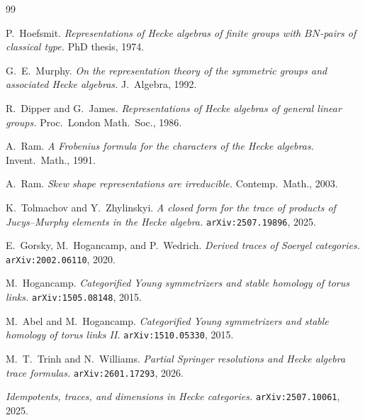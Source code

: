 \documentclass[11pt]{article}
\theoremstyle{definition}
\begin{document}
\begin{thebibliography}{99}

P.~Hoefsmit.
\emph{Representations of Hecke algebras of finite groups with $BN$-pairs of classical type.}
PhD thesis, 1974.

G.~E.~Murphy.
\emph{On the representation theory of the symmetric groups and associated Hecke algebras.}
J.\ Algebra, 1992.

R.~Dipper and G.~James.
\emph{Representations of Hecke algebras of general linear groups.}
Proc.\ London Math.\ Soc., 1986.

A.~Ram.
\emph{A Frobenius formula for the characters of the Hecke algebras.}
Invent.\ Math., 1991.

A.~Ram.
\emph{Skew shape representations are irreducible.}
Contemp.\ Math., 2003.

K.~Tolmachov and Y.~Zhylinskyi.
\emph{A closed form for the trace of products of Jucys--Murphy elements in the Hecke algebra.}
\texttt{arXiv:2507.19896}, 2025.

E.~Gorsky, M.~Hogancamp, and P.~Wedrich.
\emph{Derived traces of Soergel categories.}
\texttt{arXiv:2002.06110}, 2020.

M.~Hogancamp.
\emph{Categorified Young symmetrizers and stable homology of torus links.}
\texttt{arXiv:1505.08148}, 2015.

M.~Abel and M.~Hogancamp.
\emph{Categorified Young symmetrizers and stable homology of torus links II.}
\texttt{arXiv:1510.05330}, 2015.

M.~T.~Trinh and N.~Williams.
\emph{Partial Springer resolutions and Hecke algebra trace formulas.}
\texttt{arXiv:2601.17293}, 2026.

\emph{Idempotents, traces, and dimensions in Hecke categories.}
\texttt{arXiv:2507.10061}, 2025.


\end{thebibliography}
\end{document}
